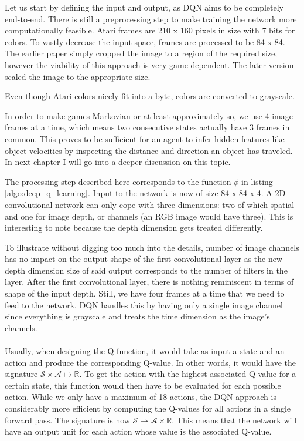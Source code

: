 Let us start by defining the input and output,
as DQN aims to be completely end-to-end.
There is still a preprocessing step to make training
the network more computationally feasible.
Atari frames are 210 x 160 pixels in size
with 7 bits for colors.
To vastly decrease the input space,
frames are processed to be 84 x 84.
The earlier paper simply cropped the image to
a region of the required size,
however the viability of this approach
is very game-dependent.
The later version scaled the image to the appropriate size.

Even though Atari colors nicely fit into a byte,
colors are converted to grayscale.

In order to make games Markovian or at least approximately so,
we use 4 image frames at a time,
which means two consecutive states
actually have 3 frames in common.
This proves to be sufficient for an agent to infer hidden features
like object velocities by inspecting the distance and direction
an object has traveled.
In next chapter I will go into a deeper discussion on this topic.

The processing step described here corresponds to
the function $\phi$ in listing \ref{algo:deep_q_learning}.
Input to the network is now of size 84 x 84 x 4.
A 2D convolutional network can only cope with three dimensions:
two of which spatial and one for image depth,
or channels (an RGB image would have three).
This is interesting to note because the depth dimension
gets treated differently.

To illustrate without digging too much into the details,
number of image channels has no impact on the output shape of the
first convolutional layer as the new depth dimension size
of said output corresponds to the number of filters in the layer.
After the first convolutional layer,
there is nothing reminiscent in terms of shape
of the input depth.
Still, we have four frames at a time that we need to feed to the network.
DQN handles this by having only a single image channel
since everything is grayscale
and treats the time dimension as the image's channels.

\paragraph{}
Usually, when designing the Q function,
it would take as input a state and an action and produce
the corresponding Q-value.
In other words,
it would have the signature
$\mathcal{S} \times \mathcal{A} \mapsto \mathbb{R}$.
To get the action with the highest associated Q-value
for a certain state,
this function would then have to be evaluated
for each possible action.
While we only have a maximum of 18 actions,
the DQN approach is considerably more efficient
by computing the Q-values for all actions in a single forward pass.
The signature is now
$\mathcal{S} \mapsto \mathcal{A} \times \mathbb{R}$.
This means that the network will have an output unit
for each action whose value is the associated Q-value.

